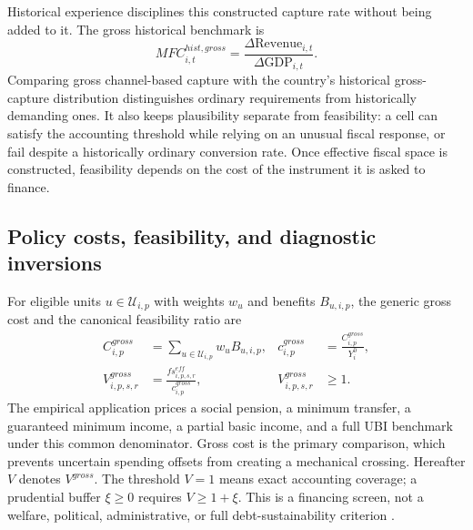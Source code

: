 Historical experience disciplines this constructed capture rate without being added to it. The gross historical benchmark is
\begin{equation}
  MFC^{hist,gross}_{i,t}
  =\frac{\Delta \mathrm{Revenue}_{i,t}}{\Delta \mathrm{GDP}_{i,t}}.
  \label{eq:mfc_historical_clean}
\end{equation}
Comparing gross channel-based capture with the country's historical gross-capture distribution distinguishes ordinary requirements from historically demanding ones. It also keeps plausibility separate from feasibility: a cell can satisfy the accounting threshold while relying on an unusual fiscal response, or fail despite a historically ordinary conversion rate. Once effective fiscal space is constructed, feasibility depends on the cost of the instrument it is asked to finance.

\subsection{Policy costs, feasibility, and diagnostic inversions}\label{subsec:feasibility_inversions}

For eligible units $u\in\mathcal U_{i,p}$ with weights $w_u$ and benefits $B_{u,i,p}$, the generic gross cost and the canonical feasibility ratio are
\begin{align}
  C^{gross}_{i,p}
    &=\sum_{u\in\mathcal U_{i,p}}w_uB_{u,i,p},
  &c^{gross}_{i,p}
    &=\frac{C^{gross}_{i,p}}{Y_i^0},
    \label{eq:policy_cost_clean}\\
  V^{gross}_{i,p,s,r}
    &=\frac{fs^{eff}_{i,p,s,r}}{c^{gross}_{i,p}},
  &V^{gross}_{i,p,s,r}&\geq1.
    \label{eq:viability_clean}
\end{align}
The empirical application prices a social pension, a minimum transfer, a guaranteed minimum income, a partial basic income, and a full UBI benchmark under this common denominator. Gross cost is the primary comparison, which prevents uncertain spending offsets from creating a mechanical crossing. Hereafter $V$ denotes $V^{gross}$. The threshold $V=1$ means exact accounting coverage; a prudential buffer $\xi\geq0$ requires $V\geq1+\xi$. This is a financing screen, not a welfare, political, administrative, or full debt-sustainability criterion \citep{imf2016fiscalspace}.

